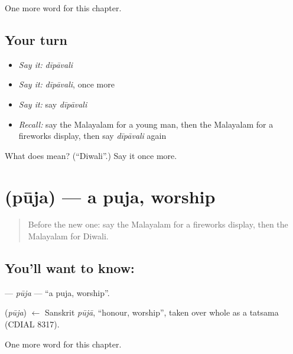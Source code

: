 \begin{grammarlens}[title={What you've built}]
One more word for this chapter.
\end{grammarlens}

\subsection*{Your turn}
\begin{itemize}
\raggedright
  \item \emph{Say it:} \emph{dīpāvali}
  \item \emph{Say it:} \emph{dīpāvali}, once more
  \item \emph{Say it:} say \emph{dīpāvali}
  \item \emph{Recall:} say the Malayalam for a young man, then the Malayalam for a fireworks display, then say \emph{dīpāvali} again
\end{itemize}

\begin{tcolorbox}[breakable,colback=teal!4,colframe=teal!35!black,title={Before you move on}]
What does  mean? (\textquotedblleft{}Diwali\textquotedblright{}.) Say it once more.
\end{tcolorbox}
\section[\texorpdfstring{\ml{പൂജ} (pūja)}{പൂജ (pūja)}]{ (pūja) — a puja, worship}

\label{lesson:ML-C326-puja}



\begin{quote}
Before the new one: say the Malayalam for a fireworks display, then the Malayalam for Diwali.
\end{quote}

\subsection*{You'll want to know: }
\textbf{} — \emph{pūja} — \textquotedblleft{}a puja, worship\textquotedblright{}.

\begin{cousinweb}
\textbf{} (\emph{pūja}) $\leftarrow$ Sanskrit \emph{pūjā}, \textquotedblleft{}honour, worship\textquotedblright{}, taken over whole as a tatsama (CDIAL 8317).
\end{cousinweb}

\begin{grammarlens}[title={What you've built}]
One more word for this chapter.
\end{grammarlens}

